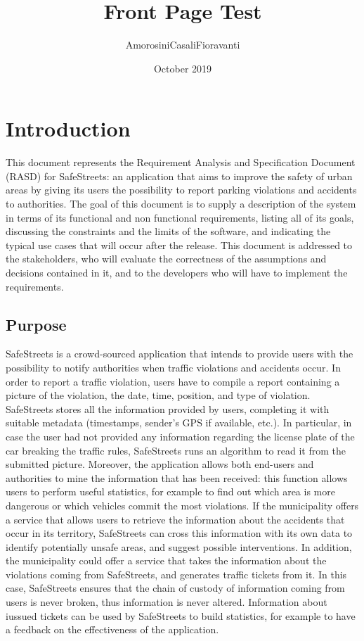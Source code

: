 \documentclass{report}
\title{Front Page Test}
\author{AmorosiniCasaliFioravanti}
\date{October 2019}
\begin{document}
\maketitle 
\tableofcontents
\chapter{Introduction}
This document represents the Requirement Analysis and Specification Document (RASD) for SafeStreets: an application that aims to improve the safety of urban areas by giving its users the possibility to report parking violations and accidents to authorities. The goal of this document is to supply a description of the system in terms of its functional and non functional requirements, listing all of its goals, discussing the constraints and the limits of the software, and indicating the typical use cases that will occur after the release. This document is addressed to the stakeholders, who will evaluate the correctness of the assumptions and decisions contained in it, and to the developers who will have to implement the requirements.
\section{Purpose}
SafeStreets is a crowd-sourced application that intends to provide users with the possibility to notify authorities when traffic violations and accidents occur. In order to report a traffic violation, users have to compile a report containing a picture of the violation, the date, time, position, and type of violation. SafeStreets stores all the information provided by users, completing it with suitable metadata (timestamps, sender's GPS if available, etc.). In particular, in case the user had not provided any information regarding the license plate of the car breaking the traffic rules, SafeStreets runs an algorithm to read it from the submitted picture. Moreover, the application allows both end-users and authorities to mine the information that has been received: this function allows users to perform useful statistics, for example to find out which area is more dangerous or which vehicles commit the most violations. If the municipality offers a service that allows users to retrieve the information about the accidents that occur in its territory, SafeStreets can cross this information with its own data to identify potentially unsafe areas, and suggest possible interventions.
In addition, the municipality could offer a service that takes the information about the violations coming from SafeStreets, and generates traffic tickets from it. In this case, SafeStreets ensures that the chain of custody of information coming from users is never broken, thus information is never altered. Information about iussued tickets can be used by SafeStreets to build statistics, for example to have a feedback on the effectiveness of the application.
\end{document}
